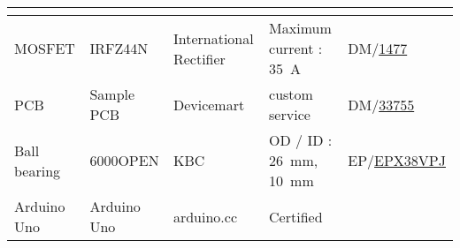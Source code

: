 \begin{landscape}
\begin{table}[h]
\begin{center}
\begin{tabular}{m{}||m{}|m{}|m{}|m{}}
			
			\hline
			\multicolumn{5}{l}{\Anta} \\ \hline
			MOSFET & IRFZ44N & {\small International Rectifier} & Maximum current : \SI{35}{\ampere} & DM/\url{1477} \\
			\hline
			PCB & Sample PCB & Devicemart & custom service & DM/\url{33755} \\
			\hline
			Ball bearing & 6000OPEN & KBC & OD / ID : \SI{26}{\milli\meter}, \SI{10}{\milli\meter} & EP/\url{EPX38VPJ} \\
			\hline
			Arduino Uno & Arduino Uno & arduino.cc & Certified & \\
			\hline
		\end{tabular}
	\end{center}
\end{table}

	
\end{landscape}
